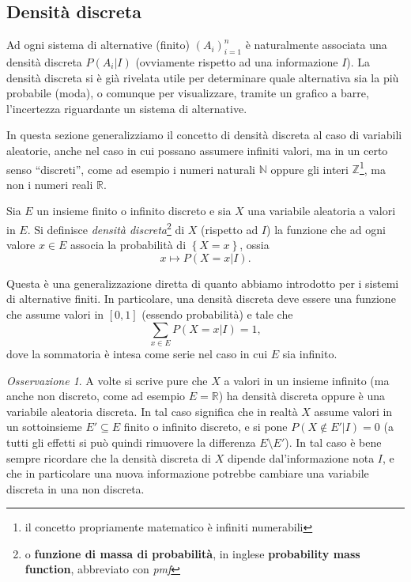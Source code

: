 \documentclass[
  italian,
  letterpaper,
]{book}
\newcommand{\cur}[1]{\left\{ #1 \right\}}
\newcommand{\R}{\mathbb{R}}
\theoremstyle{definition}
\theoremstyle{remark}
\newtheorem*{remark}{Osservazione}
\begin{document}
\subsection{Densità discreta}\label{densituxe0-discreta-1}

Ad ogni sistema di alternative (finito) \((A_i)_{i=1}^n\) è naturalmente
associata una densità discreta \(P(A_i |I)\) (ovviamente rispetto ad una
informazione \(I\)). La densità discreta si è già rivelata utile per
determinare quale alternativa sia la più probabile (moda), o comunque
per visualizzare, tramite un grafico a barre, l'incertezza riguardante
un sistema di alternative.

In questa sezione generalizziamo il concetto di densità discreta al caso
di variabili aleatorie, anche nel caso in cui possano assumere infiniti
valori, ma in un certo senso ``discreti'', come ad esempio i numeri
naturali \(\mathbb{N}\) oppure gli interi \(\mathbb{Z}\)\footnote{il
  concetto propriamente matematico è infiniti numerabili}, ma non i
numeri reali \(\R\).

Sia \(E\) un insieme finito o infinito discreto e sia \(X\) una
variabile aleatoria a valori in \(E\). Si definisce \emph{densità
discreta}\footnote{o \textbf{funzione di massa di probabilità}, in
  inglese \textbf{probability mass function}, abbreviato con \emph{pmf}}
di \(X\) (rispetto ad \(I\)) la funzione che ad ogni valore \(x \in E\)
associa la probabilità di \(\cur{X= x}\), ossia
\[  x \mapsto P(X=x|I).\]

Questa è una generalizzazione diretta di quanto abbiamo introdotto per i
sistemi di alternative finiti. In particolare, una densità discreta deve
essere una funzione che assume valori in \([0,1]\) (essendo probabilità)
e tale che \[ \sum_{x \in E} P(X = x | I) = 1,\] dove la sommatoria è
intesa come serie nel caso in cui \(E\) sia infinito.

\begin{remark}
A volte si scrive pure che \(X\) a valori in un insieme infinito (ma
anche non discreto, come ad esempio \(E = \R\)) ha densità discreta
oppure è una variabile aleatoria discreta. In tal caso significa che in
realtà \(X\) assume valori in un sottoinsieme \(E' \subseteq E\) finito
o infinito discreto, e si pone \(P(X \notin E' | I) = 0\) (a tutti gli
effetti si può quindi rimuovere la differenza \(E\setminus E'\)). In tal
caso è bene sempre ricordare che la densità discreta di \(X\) dipende
dal'informazione nota \(I\), e che in particolare una nuova informazione
potrebbe cambiare una variabile discreta in una non discreta.
\end{remark}
\end{document}
